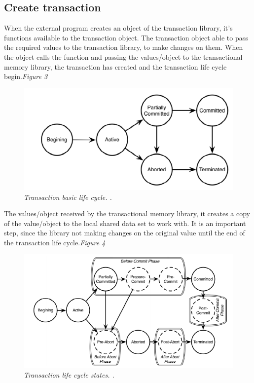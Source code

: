 \documentclass[12pt]{article}
\begin{document}
\clearpage
\subsection{Create transaction}
When the external program creates an object of the transaction library, it's functions available to the transaction object. The transaction object able to pass the required values to the transaction library, to make changes on them. When the object calls the function and passing the values/object to the transactional memory library, the transaction has created and the transaction life cycle begin.\textit{\color{gray}Figure 3}

\begin{figure}[h!]
\centering
\includegraphics[scale=0.4]{Pictures/begin.png}
\caption{\textit{\color{gray}Transaction basic life cycle. \cite{DLUATM}.}}
\end{figure}

The values/object received by the transactional memory library, it creates a copy of the value/object to the local shared data set to work with. It is an important step, since the library not making changes on the original value until the end of the transaction life cycle.\textit{\color{gray}Figure 4}

\begin{figure}[h!]
\centering
\includegraphics[scale=0.4]{Pictures/transactionLifeCycle.png}
\caption{\textit{\color{gray}Transaction life cycle states. \cite{DLUATM}.}}
\end{figure}
\end{document}
